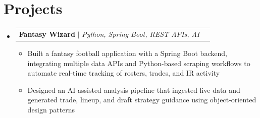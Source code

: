 \documentclass[letterpaper,11pt]{article}
\makeatletter
\newcommand{\resumeItem}[1]{
  \item\small{
    {#1 \vspace{-1pt}}
  }
}
\newcommand{\resumeProjectHeading}[2]{
    \item
    \begin{tabular*}{0.97\textwidth}{l@{\extracolsep{\fill}}r}
      \small#1 & #2 \\
    \end{tabular*}\vspace{-7pt}
}
\newcommand{\resumeSubHeadingListStart}{\begin{itemize}[leftmargin=0.15in, label={}]}
\newcommand{\resumeSubHeadingListEnd}{\end{itemize}}
\newcommand{\resumeItemListStart}{\begin{itemize}[leftmargin=0.18in,itemsep=1pt,topsep=2pt]}
\newcommand{\resumeItemListEnd}{\end{itemize}\vspace{-5pt}}
\makeatother
\begin{document}
%
\section{Projects}
    \resumeSubHeadingListStart
      \resumeProjectHeading
          {\textbf{Fantasy Wizard} $|$ \emph{Python, Spring Boot, REST APIs, AI}}{}
          \resumeItemListStart
            \resumeItem{Built a fantasy football application with a Spring Boot backend, integrating multiple data APIs and Python-based scraping workflows to automate real-time tracking of rosters, trades, and IR activity}
            \resumeItem{Designed an AI-assisted analysis pipeline that ingested live data and generated trade, lineup, and draft strategy guidance using object-oriented design patterns}
          \resumeItemListEnd
    \resumeSubHeadingListEnd

\end{document}
